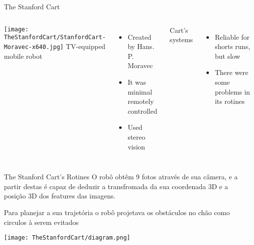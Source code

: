 \begin{frame}[c]{The Stanford Cart}
    \begin{columns}
        \texttt{[image: TheStanfordCart/StanfordCart-Moravec-x640.jpg]}
            TV-equipped mobile robot
            \begin{itemize} 
                \item Created by Hans. P. Moravec
                \item It was minimal remotely controlled
                \item Used stereo vision
            \end{itemize}
            \singlespacing
            Cart's systems
            \begin{itemize}
                \item Reliable for shorts runs, but slow
                \item There were some problems in its rotines
                 \end{itemize}
    \end{columns}
\end{frame}
\begin{frame}[t]{The Stanford Cart's Rotines}
    \vspace*{0.3cm}
    O robô obtêm 9 fotos através de sua câmera, e a partir destas é capaz de
    deduzir a transfromada da sua coordenada 3D e a posição 3D dos features das imagens.
    
    \vspace*{0.3cm}

    Para planejar a sua trajetória o robô projetava os obstáculos no chão como circulos à serem evitados
  
    \vspace*{0.8cm}
    \centering
    \texttt{[image: TheStanfordCart/diagram.png]}
\end{frame}
